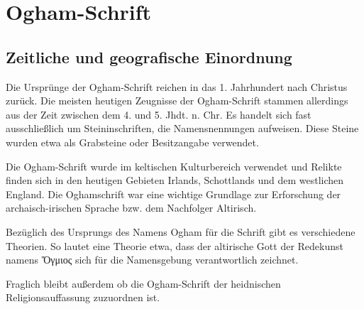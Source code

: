 \documentclass[a4paper]{scrartcl}
\begin{document}
\section{Ogham-Schrift}
\subsection{Zeitliche und geografische Einordnung}
%
Die Ursprünge der Ogham-Schrift reichen in das 1. Jahrhundert nach Christus zurück.
Die meisten heutigen Zeugnisse der Ogham-Schrift stammen allerdings aus der Zeit zwischen dem 4. und 5. Jhdt. n. Chr.
Es handelt sich fast ausschließlich um Steininschriften, die Namensnennungen aufweisen. Diese Steine wurden etwa als Grabsteine oder Besitzangabe verwendet.

Die Ogham-Schrift wurde im keltischen Kulturbereich verwendet und Relikte finden sich in den heutigen Gebieten Irlands, Schottlands und dem westlichen England. Die Oghamschrift war eine wichtige Grundlage zur Erforschung der archaisch-irischen Sprache bzw. dem Nachfolger Altirisch.

Bezüglich des Ursprungs des Namens Ogham für die Schrift gibt es verschiedene Theorien. So lautet eine Theorie etwa, dass der altirische Gott der Redekunst namens \foreignlanguage{greek}{Ὄγμιος} sich für die Namensgebung verantwortlich zeichnet. 

Fraglich bleibt außerdem ob die Ogham-Schrift der heidnischen Religionsauffassung zuzuordnen ist.
\end{document}
